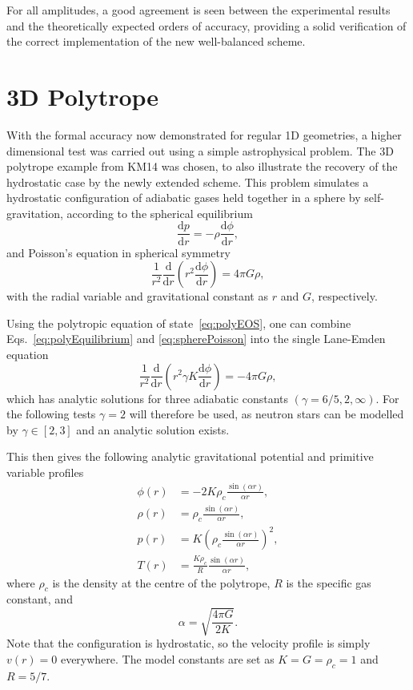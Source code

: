 For all amplitudes, a good agreement is seen between the experimental results and the theoretically expected orders of accuracy, providing a solid verification of the correct implementation of the new well-balanced scheme.


\section{3D Polytrope}
\label{sec:polytrope}

With the formal accuracy now demonstrated for regular 1D geometries, a higher dimensional test was carried out using a simple astrophysical problem. The 3D polytrope example from KM14 was chosen, to also illustrate the recovery of the hydrostatic case by the newly extended scheme. This problem simulates a hydrostatic configuration of adiabatic gases held together in a sphere by self-gravitation, according to the spherical equilibrium
\begin{equation} \label{eq:polyEquilibrium}
\frac{\textrm{d}p}{\textrm{d}r}=-\rho\frac{\textrm{d}\phi}{\textrm{d}r},
\end{equation}
and Poisson's equation in spherical symmetry
\begin{equation} \label{eq:spherePoisson}
\frac{1}{r^2}\frac{\textrm{d}}{\textrm{d}r}\left(r^2\frac{\textrm{d}\phi}{\textrm{d}r}\right)=4\pi G\rho,
\end{equation}
with the radial variable and gravitational constant as $r$ and $G$, respectively.

Using the polytropic equation of state~\eqref{eq:polyEOS}, one can combine Eqs.~\eqref{eq:polyEquilibrium} and \eqref{eq:spherePoisson} into the single Lane-Emden equation
\begin{equation}
\frac{1}{r^2}\frac{\textrm{d}}{\textrm{d}r}\left(r^2\gamma K\frac{\textrm{d}\phi}{\textrm{d}r}\right)=-4\pi G\rho,
\end{equation}
which has analytic solutions for three adiabatic constants $(\gamma=6/5,2,\infty)$. For the following tests $\gamma=2$ will therefore be used, as neutron stars can be modelled by $\gamma\in[2,3]$ and an analytic solution exists.

This then gives the following analytic gravitational potential and primitive variable profiles
\begin{align}
\phi(r)&=-2K\rho_c\frac{\sin(\alpha r)}{\alpha r}, \\
\rho(r)&=\rho_c\frac{\sin(\alpha r)}{\alpha r}, \\
p(r)&=K\left(\rho_c\frac{\sin(\alpha r)}{\alpha r}\right)^2, \\
T(r)&=\frac{K\rho_c}{R}\frac{\sin(\alpha r)}{\alpha r},
\end{align}
where $\rho_c$ is the density at the centre of the polytrope, $R$ is the specific gas constant, and
\begin{equation}
\alpha=\sqrt{\frac{4\pi G}{2K}}.
\end{equation}
Note that the configuration is hydrostatic, so the velocity profile is simply $v(r)=0$ everywhere. The model constants are set as $K=G=\rho_c=1$ and $R=5/7$.

